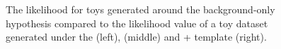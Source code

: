 \begin{figure}[h!]
\caption{The likelihood for toys generated around the background-only hypothesis compared to the likelihood value of a toy dataset generated under the \PYTHIA (left), \HERWIG{} (middle) and \MADGRAPH{}+ template (right).}
\label{fig:gof}
\end{figure}
